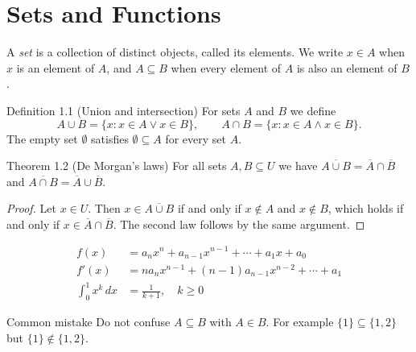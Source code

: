 \documentclass[11pt]{article}
\begin{document}
\section{Sets and Functions}
A \emph{set} is a collection of distinct objects, called its elements. We write $x \in A$ when $x$ is an element of $A$, and $A \subseteq B$ when every element of $A$ is also an element of $B$.
\begin{defbox}{Definition 1.1 (Union and intersection)}
For sets $A$ and $B$ we define
\[ A \cup B = \{x : x \in A \lor x \in B\}, \qquad A \cap B = \{x : x \in A \land x \in B\}. \]
The empty set $\emptyset$ satisfies $\emptyset \subseteq A$ for every set $A$.
\end{defbox}
\begin{thmbox}{Theorem 1.2 (De Morgan's laws)}
For all sets $A, B \subseteq U$ we have $\overline{A \cup B} = \overline{A} \cap \overline{B}$ and $\overline{A \cap B} = \overline{A} \cup \overline{B}$.
\end{thmbox}
\begin{proof}
Let $x \in U$. Then $x \in \overline{A \cup B}$ if and only if $x \notin A$ and $x \notin B$, which holds if and only if $x \in \overline{A} \cap \overline{B}$. The second law follows by the same argument.
\end{proof}
\begin{align}
f(x) &= a_n x^n + a_{n-1} x^{n-1} + \cdots + a_1 x + a_0 \\
f'(x) &= n a_n x^{n-1} + (n-1) a_{n-1} x^{n-2} + \cdots + a_1 \\
\int_0^1 x^k \, dx &= \frac{1}{k+1}, \quad k \geq 0
\end{align}
\begin{warnbox}{Common mistake}
Do not confuse $A \subseteq B$ with $A \in B$. For example $\{1\} \subseteq \{1,2\}$ but $\{1\} \notin \{1,2\}$.
\end{warnbox}
\end{document}
